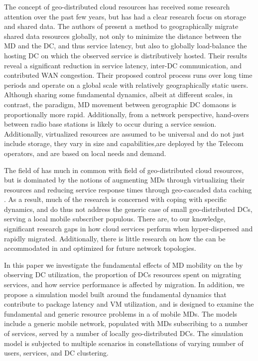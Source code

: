 The concept of geo-distributed cloud resources has received some research attention over the past few years, but has had a clear research focus on storage and shared data. The authors of \cite{agarwal2010volley} present a method to geographically migrate shared data resources globally, not only to minimize the distance between the \ac{MD} and the \ac{DC}, and thus service latency, but also to globally load-balance the hosting \ac{DC} on which the observed service is distributively hosted. Their results reveal a significant reduction in service latency, inter-\ac{DC} communication, and contributed WAN congestion. Their proposed control process runs over long time periods and operate on a global scale with relatively geographically static users. Although sharing some fundamental dynamics, albeit at different scales, in contrast, the \xcloud{} paradigm, \ac{MD} movement between gerographic \ac{DC} domaons is proportionally more rapid. Additionally, from a network perspective, hand-overs between radio base stations is likely to occur during a service session. Additionally, \xcloud{} virtualized resources are assumed to be universal and do not just include storage, they vary in size and capabilities,are deployed by the Telecom operators, and are based on local needs and demand.

The field of \xcloud{} has much in common with field of geo-distributed cloud resources, but is dominated by the notions of augmenting \ac{MD}s through virtualizing their resources \cite{6563280} and reducing service response times through geo-cascaded data caching \cite{1437087,ericsson_akami}. As a result, much of the research is concerned with coping with specific dynamics, and do thus not address the generic case of small geo-distributed \ac{DC}s, serving a local mobile subscriber populous. There are, to our knowledge, significant research gaps in how cloud services perform when hyper-dispersed and rapidly migrated. Additionally, there is little research on how the \xcloud{} can be accommodated in and optimized for future network topologies.

In this paper we investigate the fundamental effects of \ac{MD} mobility on the \xcloud{} by observing \ac{DC} utilization, the proportion of \ac{DC}s resources spent on migrating services, and how service performance is affected by migration. In addition, we propose a simulation model built around the fundamental dynamics that contribute to package latency and VM utilization, and is designed to examine the fundamental and generic resource problems in a \xcloud{} of mobile \ac{MD}s. The models include a generic mobile network, populated with \ac{MD}s subscribing to a number of services, served by a number of locally geo-distributed \ac{DC}s. The simulation model is subjected to multiple scenarios in constellations of varying number of users, services, and \ac{DC} clustering.

